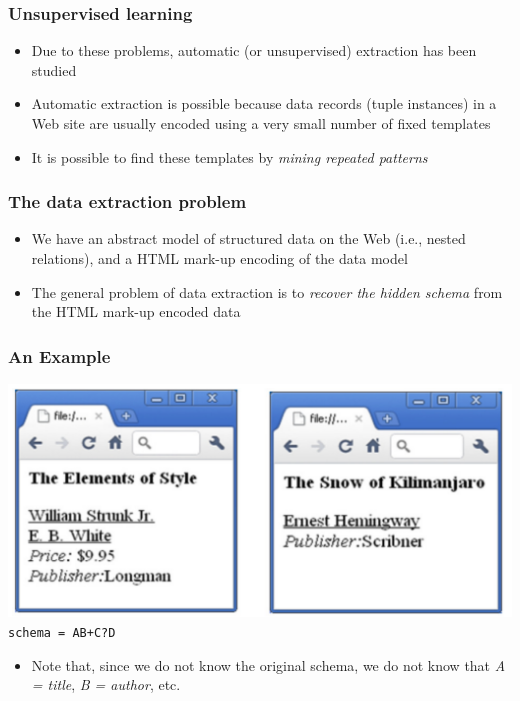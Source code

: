 \documentclass[svgnames]{beamer}
\begin{document}

\begin{frame} \frametitle{Unsupervised learning}
  
    \begin{itemize}
    \item Due to these problems, automatic (or unsupervised) extraction has been
        studied
    \item Automatic extraction is possible because data records (tuple
        instances) in a Web site are usually encoded using a very small number
        of fixed templates
    \item It is possible to find these templates by \emph{mining repeated
          patterns}
    \end{itemize}
    
\end{frame}


\begin{frame} \frametitle{The data extraction problem}
  
  \begin{itemize}
  \item We have an abstract model of structured data on the Web (i.e., nested
      relations), and a HTML mark-up encoding of the data model
  \item The general problem of data extraction is to \emph{recover the hidden
        schema} from the HTML mark-up encoded data
  \end{itemize}

\end{frame}


\begin{frame}
    \frametitle{An Example}
    
    \begin{center}
        \includegraphics[width=.65\linewidth]{cap-schema}\\
        \texttt{schema = AB+C?D}
    \end{center}

    \begin{itemize}
    \item<2-> Note that, since we do not know the original schema, we do not know
        that \textit{A = title}, \textit{B = author}, etc.
    \end{itemize}

\end{frame}
\end{document}
